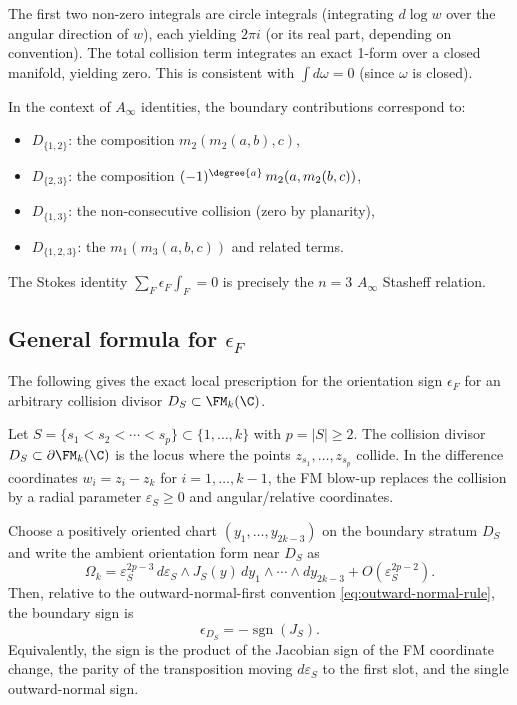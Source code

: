 The first two non-zero integrals are circle integrals (integrating $d\log w$ over the angular direction of $w$), each yielding $2\pi i$ (or its real part, depending on convention). The total collision term integrates an exact 1-form over a closed manifold, yielding zero. This is consistent with $\int d\omega = 0$ (since $\omega$ is closed).

\begin{remark}
In the context of $A_\infty$ identities, the boundary contributions correspond to:
\begin{itemize}
\item $D_{\{1,2\}}$: the composition $m_2(m_2(a,b),c)$,
\item $D_{\{2,3\}}$: the composition $(-1)^{\degree{a}}\,m_2(a,m_2(b,c))$,
\item $D_{\{1,3\}}$: the non-consecutive collision (zero by planarity),
\item $D_{\{1,2,3\}}$: the $m_1(m_3(a,b,c))$ and related terms.
\end{itemize}
The Stokes identity $\sum_F \epsilon_F \int_F = 0$ is precisely the $n=3$ $A_\infty$ Stasheff relation.
\end{remark}

\subsection{\texorpdfstring{General formula for $\epsilon_F$}{General formula for epsilon F}}
\label{subsec:general-eps}

The following gives the exact local prescription for the orientation sign
$\epsilon_F$ for an arbitrary collision divisor
$D_S \subset \FM_k(\C)$.

\begin{proposition}
\label{prop:general-orient-sign}
Let $S = \{s_1 < s_2 < \cdots < s_p\} \subset \{1,\ldots,k\}$ with $p = |S| \ge 2$. The collision divisor $D_S \subset \partial\FM_k(\C)$ is the locus where the points $z_{s_1},\ldots,z_{s_p}$ collide. In the difference coordinates $w_i = z_i - z_k$ for $i = 1,\ldots,k-1$, the FM blow-up replaces the collision by a radial parameter $\varepsilon_S \ge 0$ and angular/relative coordinates.

Choose a positively oriented chart
$(y_1,\ldots,y_{2k-3})$ on the boundary stratum $D_S$ and write the
ambient orientation form near $D_S$ as
\begin{equation}
\label{eq:general-eps-formula}
\Omega_k
=
\varepsilon_S^{2p-3}\,
d\varepsilon_S\wedge
J_S(y)\,dy_1\wedge\cdots\wedge dy_{2k-3}
+O(\varepsilon_S^{2p-2}).
\end{equation}
Then, relative to the outward-normal-first convention
\eqref{eq:outward-normal-rule}, the boundary sign is
\begin{equation}
\label{eq:sigma-S-formula}
\epsilon_{D_S}=-\operatorname{sgn}(J_S).
\end{equation}
Equivalently, the sign is the product of the Jacobian sign of the FM
coordinate change, the parity of the transposition moving
$d\varepsilon_S$ to the first slot, and the single outward-normal sign.
\end{proposition}

